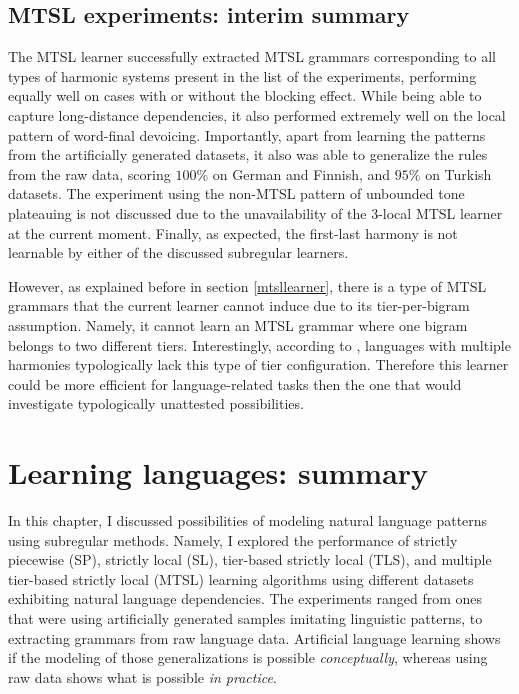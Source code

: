 \subsection{MTSL experiments: interim summary}

The MTSL learner successfully extracted MTSL grammars corresponding to all types of harmonic systems present in the list of the experiments, performing equally well on cases with or without the blocking effect.
While being able to capture long-distance dependencies, it also performed extremely well on the local pattern of word-final devoicing.
Importantly, apart from learning the patterns from the artificially generated datasets, it also was able to generalize the rules from the raw data, scoring $100$\% on German and Finnish, and $95$\% on Turkish datasets.
The experiment using the non-MTSL pattern of unbounded tone plateauing is not discussed due to the unavailability of the $3$-local MTSL learner at the current moment.
Finally, as expected, the first-last harmony is not learnable by either of the discussed subregular learners.


However, as explained before in section \ref{mtsllearner}, there is a type of MTSL grammars that the current learner cannot induce due to its tier-per-bigram assumption.
Namely, it cannot learn an MTSL grammar where one bigram belongs to two different tiers.
Interestingly, according to \cite{AksenovaDeshmukh2018}, languages with multiple harmonies typologically lack this type of tier configuration.
Therefore this learner could be more efficient for language-related tasks then the one that would investigate typologically unattested possibilities.


\section{Learning languages: summary}
\label{interimsummarylanguages}

In this chapter, I discussed possibilities of modeling natural language patterns using subregular methods.
Namely, I explored the performance of strictly piecewise (SP), strictly local (SL), tier-based strictly local (TLS), and multiple tier-based strictly local (MTSL) learning algorithms using different datasets exhibiting natural language dependencies.
The experiments ranged from ones that were using artificially generated samples imitating linguistic patterns, to extracting grammars from raw language data.
Artificial language learning shows if the modeling of those generalizations is possible \emph{conceptually}, whereas using raw data shows what is possible \emph{in practice}.

